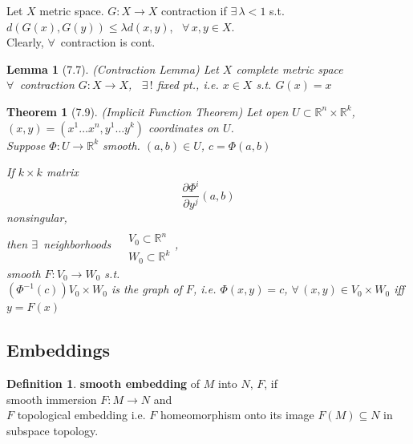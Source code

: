 \documentclass[11pt]{amsart}
\newtheorem{theorem}{Theorem}
\newtheorem{lemma}{Lemma}
\theoremstyle{definition}
\newtheorem{definition}{Definition}
\begin{document}
Let $X$ metric space.  $G:X \to X$ contraction if $\exists \, \lambda <1$ s.t. $d(G(x), G(y)) \leq \lambda d(x,y)$, \, $\forall \, x, y \in X$.  \\
Clearly, $\forall \, $ contraction is cont.

\begin{lemma}[7.7] (Contraction Lemma)
Let $X$ complete metric space \\
$\forall \,$ contraction $G: X \to X$, \, $\exists \, !$ fixed pt., i.e. $x\in X$ s.t. $G(x) = x$
\end{lemma}

\begin{theorem}[7.9] (Implicit Function Theorem)
  Let open $U \subset \mathbb{R}^n \times \mathbb{R}^k$, $(x,y) = (x^1 \dots x^n, y^1 \dots y^k)$ coordinates on $U$.  \\

Suppose $\Phi : U \to \mathbb{R}^k$ smooth.  $(a,b) \in U$, $c = \Phi(a,b)$

If $k\times k$ matrix
\[
\frac{ \partial \Phi^i }{ \partial y^j }(a,b)
\]
nonsingular, \\
then $\exists \, $ neighborhoods $\begin{aligned} & \quad \\
  & V_0 \subset \mathbb{R}^n \\
  & W_0 \subset \mathbb{R}^k \end{aligned}$,  \\
smooth $F: V_0 \to W_0$ s.t. \\
$(\Phi^{-1}(c) ) V_0 \times W_0$ is the graph of $F$, i.e. $\Phi(x,y) = c$, $\forall \, (x,y) \in V_0 \times W_0$ iff $y= F(x)$


\end{theorem}



\subsection*{Embeddings}

\begin{definition}
\textbf{smooth embedding} of $M$ into $N$, $F$, if \\
\phantom{ \quad \, } smooth immersion $F: M\to N$ and \\
\phantom{ \quad \quad \, } $F$ topological embedding i.e. $F$ homeomorphism onto its image $F(M) \subseteq N$ in subspace topology.

\end{definition}
\end{document}
